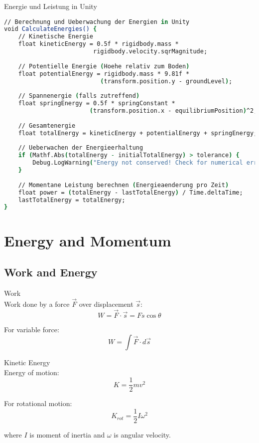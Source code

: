 \begin{examplecode}{Energie und Leistung in Unity}\\
    \begin{lstlisting}[language=csh, style=basesmol]
// Berechnung und Ueberwachung der Energien in Unity
void CalculateEnergies() {
    // Kinetische Energie
    float kineticEnergy = 0.5f * rigidbody.mass * 
                         rigidbody.velocity.sqrMagnitude;
    
    // Potentielle Energie (Hoehe relativ zum Boden)
    float potentialEnergy = rigidbody.mass * 9.81f * 
                           (transform.position.y - groundLevel);
    
    // Spannenergie (falls zutreffend)
    float springEnergy = 0.5f * springConstant * 
                        (transform.position.x - equilibriumPosition)^2;
    
    // Gesamtenergie
    float totalEnergy = kineticEnergy + potentialEnergy + springEnergy;
    
    // Ueberwachen der Energieerhaltung
    if (Mathf.Abs(totalEnergy - initialTotalEnergy) > tolerance) {
        Debug.LogWarning("Energy not conserved! Check for numerical errors or non-conservative forces.");
    }
    
    // Momentane Leistung berechnen (Energieaenderung pro Zeit)
    float power = (totalEnergy - lastTotalEnergy) / Time.deltaTime;
    lastTotalEnergy = totalEnergy;
}
    \end{lstlisting}
\end{examplecode}

\section{Energy and Momentum}

\subsection{Work and Energy}

\begin{definition}{Work}\\
    Work done by a force $\vec{F}$ over displacement $\vec{s}$:
    $$W = \vec{F} \cdot \vec{s} = Fs\cos\theta$$
    
    For variable force:
    $$W = \int \vec{F} \cdot d\vec{s}$$
\end{definition}

\begin{definition}{Kinetic Energy}\\
    Energy of motion:
    $$K = \frac{1}{2}mv^2$$
    
    For rotational motion:
    $$K_{rot} = \frac{1}{2}I\omega^2$$
    
    where $I$ is moment of inertia and $\omega$ is angular velocity.
\end{definition}

